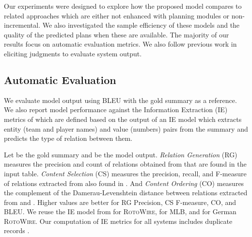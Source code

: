 Our experiments were designed to explore how the proposed model
compares to related approaches which are either not enhanced with
planning modules or non-incremental. We also investigated the sample
efficiency of these models and the quality of the predicted plans when
these are available. The majority of our results focus on automatic
evaluation metrics. We also follow previous work
\cite{wiseman-etal-2017-challenges,DBLP:journals/corr/abs-1809-00582,
  puduppully-etal-2019-data,Puduppully-2020} in eliciting judgments to
evaluate system output.

\subsection{Automatic Evaluation}


We evaluate model output using BLEU \cite{papineni-etal-2002-bleu}
with the gold summary as a reference. We also report model performance
against the Information Extraction (IE) metrics of
\citet{wiseman-etal-2017-challenges} which are defined based on the
output of an IE model which extracts entity (team and player names)
and value (numbers) pairs from the summary and predicts the type of
relation between them.



Let  be the gold summary and  be the model
output. \textsl{Relation Generation} (RG) measures the precision and
count of relations obtained from  that are found in the input
table. \textsl{Content Selection} (CS) measures the precision, recall,
and \mbox{F-measure} of relations extracted from  also found in
. And \textsl{Content Ordering} (CO) measures the complement
of the Damerau-Levenshtein distance between relations extracted from
 and . Higher values are better for RG Precision, CS
F-measure, CO, and BLEU. We reuse the IE model from
\citet{DBLP:journals/corr/abs-1809-00582} for \textsc{RotoWire},
\citet{Puduppully-2020} for MLB, and
\citet{hayashi-etal-2019-findings} for German \textsc{RotoWire}.  Our
computation of IE metrics for all systems includes duplicate records
\cite{Puduppully-2020}.


